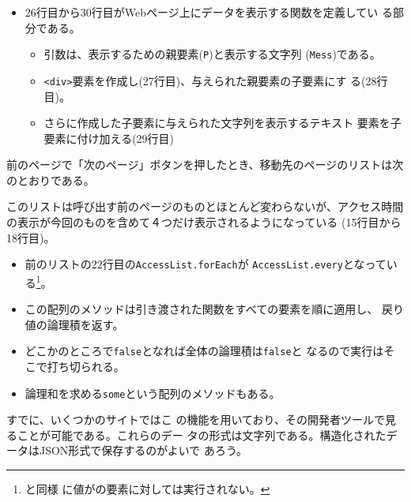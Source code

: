 \begin{Exec}
\begin{itemize}
\begin{itemize}
\end{itemize}
	\item 26行目から30行目がWebページ上にデータを表示する関数を定義してい
				る部分である。
				\begin{itemize}
				 \item 引数は、表示するための親要素(\texttt{P})と表示する文字列
							 (\texttt{Mess})である。
				 \item \texttt{<div>}要素を作成し(27行目)、与えられた親要素の子要素にす
							 る(28行目)。
				 \item さらに作成した子要素に与えられた文字列を表示するテキスト
							 要素を子要素に付け加える(29行目)
				\end{itemize}
				
 \end{itemize}
前のページで「次のページ」ボタンを押したとき、移動先のページのリストは次
 のとおりである。
\end{Exec}
このリストは呼び出す前のページのものとほとんど変わらないが、アクセス時間
の表示が今回のものを含めて４つだけ表示されるようになっている
(15行目から18行目)。
\begin{itemize}
 \item 前のリストの22行目の\Verb+AccessList.forEach+が
			 \Verb+AccessList.every+となっている\footnote{と同様
			 に値がの要素に対しては実行されない。}。
 \item この配列のメソッドは引き渡された関数をすべての要素を順に適用し、
			 戻り値の論理積を返す。
 \item どこかのところで\Verb+false+となれば全体の論理積は\Verb+false+と
			 なるので実行はそこで打ち切られる。
 \item 論理和を求める\Verb+some+という配列のメソッドもある。
\end{itemize}

すでに、いくつかのサイトではこ
の機能を用いており、その開発者ツールで見ることが可能である。これらのデー
タの形式は文字列である。構造化されたデータはJSON形式で保存するのがよいで
あろう。

\else
\fi